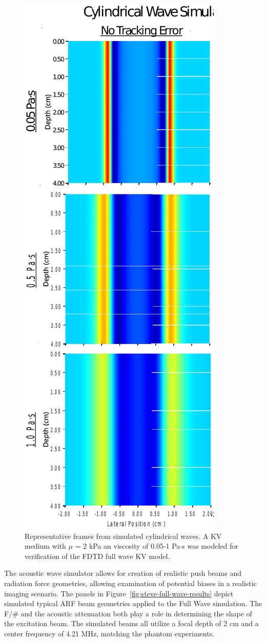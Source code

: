 \begin{figure}[htb!]
    \centering
    \includegraphics[width=0.3\linewidth, angle=270]{steve/figs/image12.png}
    \caption{Representative frames from simulated cylindrical waves.  A KV
    medium with $\mu$ = 2 kPa an viscosity of 0.05-1 Pa$\cdot$s was modeled for
    verification of the FDTD full wave KV model.} 
\label{fig:steve-cylindrical-results}
\end{figure}

The acoustic wave simulator allows for creation of realistic push beams and
radiation force geometries, allowing examination of potential biases in a
realistic imaging scenario. The panels in
Figure~\ref{fig:steve-full-wave-results} depict simulated typical ARF beam
geometries applied to the Full Wave simulation. The F/\# and the acoustic
attenuation both play a role in determining the shape of the excitation beam.
The simulated beams all utilize a focal depth of 2 cm and a center frequency of
4.21 MHz, matching the phantom experiments. 

